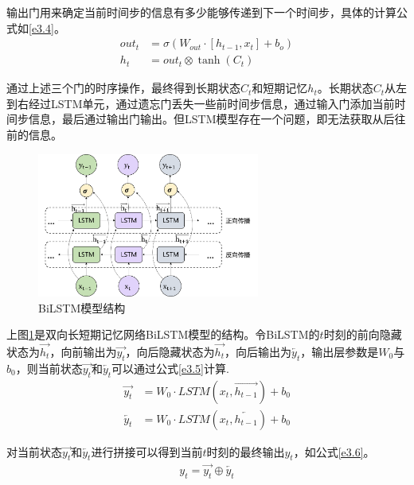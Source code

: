 输出门用来确定当前时间步的信息有多少能够传递到下一个时间步，具体的计算公式如\ref{e3.4}。
\begin{equation}\label{e3.4}
  \begin{split}
   out_t &= \sigma \left(W_{out} \cdot \left[h_{t-1},x_{t}\right] + b_o \right)
   \\
   h_t &= out_t \otimes \tanh \left(C_t\right)
  \end{split}
\end{equation}

通过上述三个门的时序操作，最终得到长期状态$C_t$和短期记忆$h_t$。长期状态$C_t$从左到右经过LSTM单元，通过遗忘门丢失一些前时间步信息，通过输入门添加当前时间步信息，最后通过输出门输出。但LSTM模型存在一个问题，即无法获取从后往前的信息。

\begin{figure}[htp] 
  \centering
  \includegraphics[width=0.65\textwidth]{figures/BiLSTM}
  \caption{BiLSTM模型结构}\label{fig:BiLSTM}
\end{figure}

上图\ref{fig:BiLSTM}是双向长短期记忆网络BiLSTM模型的结构。令BiLSTM的$t$时刻的前向隐藏状态为$\overrightarrow{h_t}$，向前输出为$\overrightarrow{y_t}$，向后隐藏状态为$\overrightarrow{h_t}$，向后输出为$\overleftarrow{y_t}$，输出层参数是$W_0$与$b_0$，则当前状态$\overrightarrow{y_t}$和$\overleftarrow{y_t}$可以通过公式\ref{e3.5}计算.
\begin{equation}\label{e3.5}
  \begin{split}
    \overrightarrow{y_t} &= W_0 \cdot LSTM\left(x_{t},\overrightarrow{h_{t-1}}\right) + b_0
    \\
    \overleftarrow{y_t} &= W_0 \cdot LSTM\left(x_{t},\overleftarrow{h_{t-1}}\right) + b_0
  \end{split}
\end{equation}

对当前状态$\overrightarrow{y_t}$和$\overleftarrow{y_t}$进行拼接可以得到当前$t$时刻的最终输出$y_t$，如公式\ref{e3.6}。
\begin{equation}\label{e3.6}
  \begin{split}
    y_t = \overrightarrow{y_t} \oplus\overleftarrow{y_t}
  \end{split}
\end{equation}

